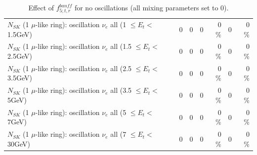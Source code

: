 \begin{table}
\begin{tabular}{| l | r | r | r  r | r  r |}
$N_{SK}$ (1 $\mu$-like ring): oscillation $\nu_{e}$ all (1 $\leq E_{t} <$ 1.5GeV) &               0 &               0 &               0 &        0 \%  &               0 &        0 \%  \\ 
$N_{SK}$ (1 $\mu$-like ring): oscillation $\nu_{e}$ all (1.5 $\leq E_{t} <$ 2.5GeV) &               0 &               0 &               0 &        0 \%  &               0 &        0 \%  \\ 
$N_{SK}$ (1 $\mu$-like ring): oscillation $\nu_{e}$ all (2.5 $\leq E_{t} <$ 3.5GeV) &               0 &               0 &               0 &        0 \%  &               0 &        0 \%  \\ 
$N_{SK}$ (1 $\mu$-like ring): oscillation $\nu_{e}$ all (3.5 $\leq E_{t} <$ 5GeV) &               0 &               0 &               0 &        0 \%  &               0 &        0 \%  \\ 
 $N_{SK}$ (1 $\mu$-like ring): oscillation $\nu_{e}$ all (5 $\leq E_{t} <$ 7GeV) &               0 &               0 &               0 &        0 \%  &               0 &        0 \%  \\ 
$N_{SK}$ (1 $\mu$-like ring): oscillation $\nu_{e}$ all (7 $\leq E_{t} <$ 30GeV) &               0 &               0 &               0 &        0 \%  &               0 &        0 \%  \\ 
\hline
\hline
\end{tabular}
\caption{ Effect of $f_{5; t, r}^{banff}$ for no oscillations (all mixing parameters set to 0). }
\label{tab:num_banff_05_1RmuT_3f_osc_t13:0}
\end{table}
\clearpage
